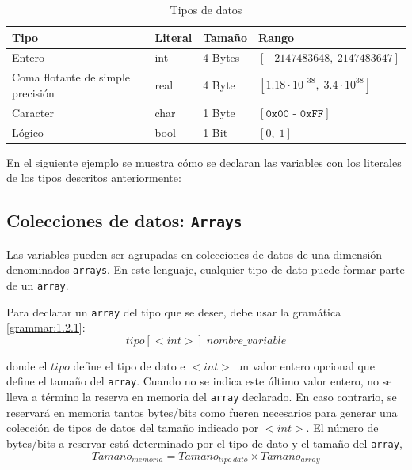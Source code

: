 \documentclass[11pt, english]{article}
\begin{document}
\begin{table}[H]
	\begin{center}
		\caption{Tipos de datos}
		\label{tab:table1}
		\begin{tabular}{l|l|l|l}
			\toprule
			\textbf{Tipo} & \textbf{Literal} & \textbf{Tamaño} & \textbf{Rango}\\
			\midrule
			Entero & int & 4 Bytes & $\left [-2147483648,\: 2147483647 \right]$\\
			Coma flotante de simple precisión & real & 4 Byte & $\left [ 1.18 \cdot 10^{–38},\; 3.4 \cdot 10^{38} \right ]$\\
			Caracter & char & 1 Byte & $\left [ \texttt{0x00 - 0xFF} \right ]$\\
			Lógico & bool & 1 Bit & $\left [0,\; 1 \right ]$\\
			\bottomrule
		\end{tabular}
	\end{center}
\end{table}

En el siguiente ejemplo se muestra cómo se declaran las variables con los literales de los tipos descritos anteriormente:



\subsection{Colecciones de datos: \texttt{Arrays}}\label{arrays}
Las variables pueden ser agrupadas en colecciones de datos de una dimensión denominados \texttt{arrays}. En este lenguaje, cualquier tipo de dato puede formar parte de un \texttt{array}.

Para declarar un \texttt{array} del tipo que se desee, debe usar la gramática \ref{grammar:1.2.1}:
	\begin{equation}\label{grammar:1.2.1}
		tipo[<int>]\; nombre\_variable
	\end{equation}

donde el $tipo$ define el tipo de dato e $<int>$ un valor entero opcional que define el tamaño del \texttt{array}. Cuando no se indica este último valor entero, no se lleva a término la reserva en memoria del \texttt{array} declarado. En caso contrario, se reservará en memoria tantos bytes/bits como fueren necesarios para generar una colección de tipos de datos del tamaño indicado por $<int>$. El número de bytes/bits a reservar está determinado por el tipo de dato y el tamaño del \texttt{array},
	\begin{equation}\label{eq:1.2}
		Tamano_{memoria} = Tamano_{tipo\, dato} \times Tamano_{array}
	\end{equation}
\end{document}
